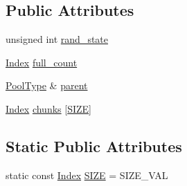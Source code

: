 \subsection*{Public Attributes}
\begin{DoxyCompactItemize}
\item 
unsigned int \hyperlink{structutil_1_1MemPoolBank_a43ec026289969363cba9a80f59d5f9b7}{rand\-\_\-state}
\item 
\hyperlink{structutil_1_1MemPoolBank_a1acaedbb0b2b5d18faa451597e54d61d}{Index} \hyperlink{structutil_1_1MemPoolBank_a789d940942286b2e8d251709f343895e}{full\-\_\-count}
\item 
\hyperlink{structutil_1_1MemPoolBank_aedc2fc3adbebd6cba13f64058ac208f8}{Pool\-Type} \& \hyperlink{structutil_1_1MemPoolBank_aab9a0222c55ef5021dd4134b24c19e32}{parent}
\item 
\hyperlink{structutil_1_1MemPoolBank_a1acaedbb0b2b5d18faa451597e54d61d}{Index} \hyperlink{structutil_1_1MemPoolBank_afbe62c62e0076ca9da5dd74ebae1727e}{chunks} \mbox{[}\hyperlink{structutil_1_1MemPoolBank_a34fea815063eea3eb1685813e29ab15b}{S\-I\-Z\-E}\mbox{]}
\end{DoxyCompactItemize}
\subsection*{Static Public Attributes}
\begin{DoxyCompactItemize}
\item 
static const \hyperlink{structutil_1_1MemPoolBank_a1acaedbb0b2b5d18faa451597e54d61d}{Index} \hyperlink{structutil_1_1MemPoolBank_a34fea815063eea3eb1685813e29ab15b}{S\-I\-Z\-E} = S\-I\-Z\-E\-\_\-\-V\-A\-L
\end{DoxyCompactItemize}


